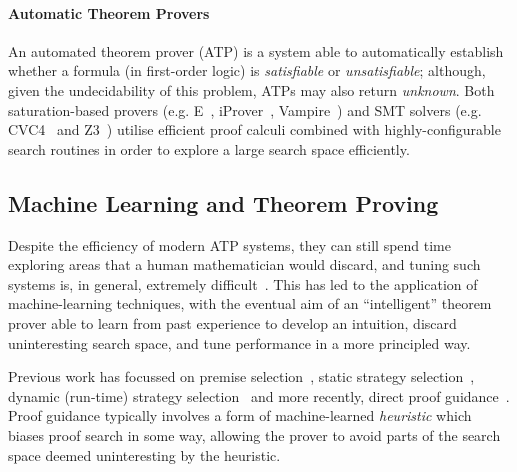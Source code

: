 \documentclass{llncs}
\begin{document}
\paragraph{Automatic Theorem Provers}
An automated theorem prover (ATP) is a system able to automatically establish whether a formula (in first-order logic) is \emph{satisfiable} or \emph{unsatisfiable}; although, given the undecidability of this problem, ATPs may also return \emph{unknown}. Both saturation-based provers (e.g. E~\cite{E}, iProver~\cite{iProver}, Vampire~\cite{Vampire}) and SMT solvers (e.g. CVC4~\cite{CVC4} and Z3~\cite{Z3}) utilise efficient proof calculi combined with highly-configurable search routines in order to explore a large search space efficiently.

\subsection{Machine Learning and Theorem Proving}
Despite the efficiency of modern ATP systems, they can still spend time exploring areas that a human mathematician would discard, and tuning such systems is, in general, extremely difficult~\cite{portfolio}.
This has led to the application of machine-learning techniques, with the eventual aim of an ``intelligent'' theorem prover able to learn from past experience to develop an intuition, discard uninteresting search space, and tune performance in a more principled way.

Previous work has focussed on premise selection~\cite{DeepMath,MaSh,MaLARea,formula-graph}, static strategy selection~\cite{Bridge,MaLeS,E-MaLeS}, dynamic (run-time) strategy selection~\cite{dynamic-strategy-priority} and more recently, direct proof guidance~\cite{MaLeCoP,FEMaLeCoP,rlCoP,ENIGMA,DNGPS}.
Proof guidance typically involves a form of machine-learned \emph{heuristic} which biases proof search in some way, allowing the prover to avoid parts of the search space deemed uninteresting by the heuristic.
\end{document}
